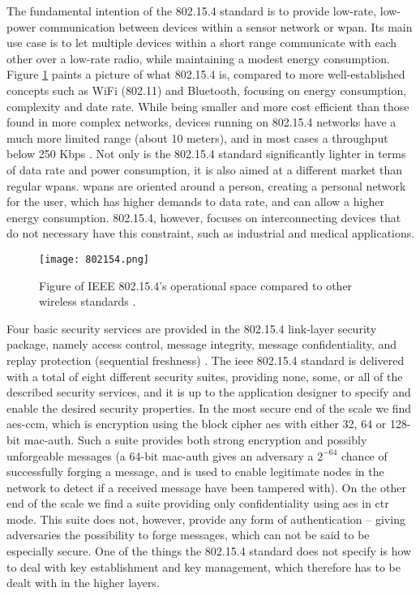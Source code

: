 The fundamental intention of the 802.15.4 standard is to provide low-rate, low-power communication between devices within a sensor network or \gls{wpan}. Its main use case is to let multiple devices within a short range communicate with each other over a low-rate radio, while maintaining a modest energy consumption. Figure \ref{fig:802154-figure} paints a picture of what 802.15.4 is, compared to more well-established concepts such as WiFi (802.11) and Bluetooth, focusing on energy consumption, complexity and date rate. While being smaller and more cost efficient than those found in more complex networks, devices running on 802.15.4 networks have a much more limited range (about 10 meters), and in most cases a throughput below 250 Kbps \cite{gutierrez2001ieee}. Not only is the 802.15.4 standard significantly lighter in terms of data rate and power consumption, it is also aimed at a different market than regular \gls{wpan}s. \gls{wpan}s are oriented around a person, creating a personal network for the user, which has higher demands to data rate, and can allow a higher energy consumption. 802.15.4, however, focuses on interconnecting devices that do not necessary have this constraint, such as industrial and medical applications. 


\begin{figure}[h]
	\centering
	\texttt{[image: 802154.png]}
	\caption{Figure of IEEE 802.15.4's operational space compared to other wireless standards \cite{gutierrez2001ieee}.}
	\label{fig:802154-figure}
\end{figure}

Four basic security services are provided in the 802.15.4 link-layer security package, namely access control, message integrity, message confidentiality, and replay protection (sequential freshness) \cite{sastry2004security}. The \gls{ieee} 802.15.4 standard is delivered with a total of eight different security suites, providing none, some, or all of the described security services, and it is up to the application designer to specify and enable the desired security properties. In the most secure end of the scale we find \gls{aes}-\gls{ccm}, which is encryption using the block cipher \gls{aes} with either 32, 64 or 128-bit \gls{mac-auth}. Such a suite provides both strong encryption and possibly unforgeable messages (a 64-bit \gls{mac-auth} gives an adversary a $2^{-64}$ chance of successfully forging a message, and is used to enable legitimate nodes in the network to detect if a received message have been tampered with). On the other end of the scale we find a suite providing only confidentiality using \gls{aes} in \gls{ctr} mode. This suite does not, however, provide any form of authentication -- giving adversaries the possibility to forge messages, which can not be said to be especially secure. One of the things the 802.15.4 standard does not specify is how to deal with key establishment and key management, which therefore has to be dealt with in the higher layers.


